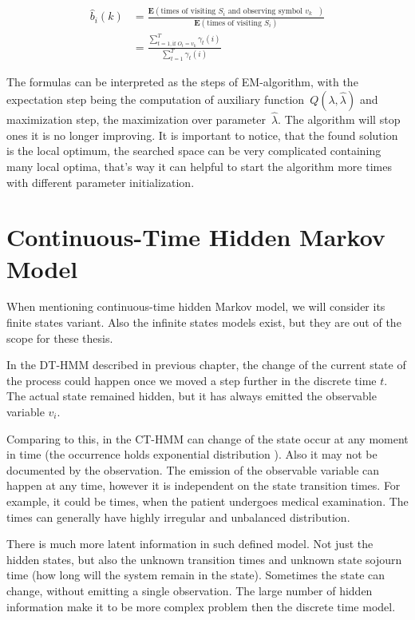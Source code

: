 \documentclass[thesis=M,english]{FITthesis}[2012/10/20]
\begin{document}
\begin{equation}
\begin{aligned}
\hat b_{i}(k) &= \frac{\mathbf{E}(\text{times of visiting $S_i$ and observing symbol $v_k$ })}
				   {\mathbf{E}(\text{times of visiting $S_i$})} \\
			  &= \frac{\sum\limits_{t=1, \text{if } O_t = v_k  }^{T} \gamma_t(i)}{\sum\limits_{t=1}^{T} \gamma_t(i) } 
\end{aligned}
\end{equation}

The formulas can be interpreted as the steps of EM-algorithm, with the expectation step being the computation of auxiliary function~$Q(\lambda,\hat\lambda)$ and maximization step, the maximization over parameter~$\hat\lambda$. The algorithm will stop ones it is no longer improving. It is important to notice, that the found solution is the local optimum, the searched space can be very complicated containing many local optima, that's way it can helpful to start the algorithm more times with different parameter initialization.  


\chapter{Continuous-Time Hidden Markov Model}

When mentioning continuous-time hidden Markov model, we will consider its finite states variant. Also the infinite states models exist, but they are out of the scope for these thesis.

In the DT-HMM described in previous chapter, the change of the current state of the process could happen once we moved a step further in the discrete time $t$. The actual state remained hidden, but it has always emitted the observable variable $v_i$.

Comparing to this, in the CT-HMM can change of the state occur at any moment in time (the occurrence holds exponential distribution ). Also it may not be documented by the observation. The emission of the observable variable can happen at any time, however it is independent on the state transition times. For example, it could be times, when the patient undergoes medical examination. The times can generally have highly irregular and unbalanced distribution.

There is much more latent information in such defined model. Not just the hidden states, but also the unknown transition times and unknown state sojourn time (how long will the system remain in the state).
Sometimes the state can change, without emitting a single observation. The large number of hidden information make it to be more complex problem then the discrete time model.
\end{document}
